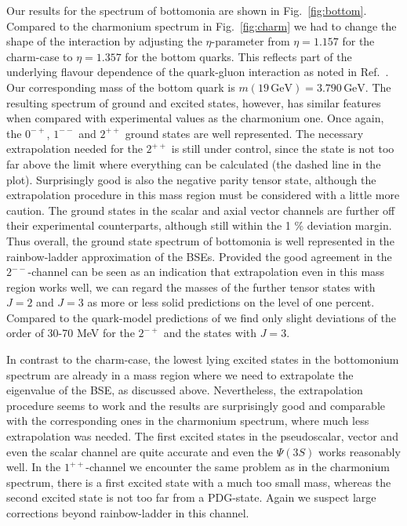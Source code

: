 Our results for the spectrum of bottomonia are shown in Fig.~\ref{fig:bottom}. Compared to
the charmonium spectrum in Fig.~\ref{fig:charm} we had to change the shape of the interaction
by adjusting the $\eta$-parameter from $\eta=1.157$ for the charm-case to $\eta=1.357$ 
for the bottom quarks. This reflects part of the underlying flavour dependence of the quark-gluon 
interaction as noted in Ref.~\cite{Williams:2014iea}. Our corresponding mass of the bottom quark
is $m(19 \,\mbox{GeV})=3.790 \,\mbox{GeV}$. The resulting spectrum of ground and excited states, 
however, has similar features when compared with experimental values as the charmonium one. 
Once again, the $0^{-+}$, $1^{--}$ and $2^{++}$ ground states are well represented. The necessary
extrapolation needed for the $2^{++}$ is still under control, since the state is not too far above
the limit where everything can be calculated (the dashed line in the plot). Surprisingly good is
also the negative parity tensor state, although the extrapolation procedure in this
mass region must be considered with a little more caution. The ground states
in the scalar and axial vector channels are further off their experimental counterparts,
although still within the 1 \% deviation margin. Thus overall, the ground state spectrum
of bottomonia is well represented in the rainbow-ladder approximation of the BSEs.
Provided the good agreement in the $2^{--}$-channel can be seen as an indication that 
extrapolation even in this mass region works well, we can regard the masses of the 
further tensor states with $J=2$ and $J=3$ as more or less solid predictions 
on the level of one percent. Compared to the quark-model predictions of \cite{Ebert:2011jc}
we find only slight deviations of the order of 30-70 MeV for the $2^{-+}$ and the states 
with $J=3$.

In contrast to the charm-case, the lowest lying excited states in the bottomonium spectrum are
already in a mass region where we need to extrapolate the eigenvalue of the BSE, as discussed
above. Nevertheless, the extrapolation procedure seems to work and the results are surprisingly
good and comparable with the corresponding ones in the charmonium spectrum, where much less
extrapolation was needed. The first excited states in the pseudoscalar, vector and even the
scalar channel are quite accurate and even the $\Psi(3S)$ works reasonably well. In the $1^{++}$-channel
we encounter the same problem as in the charmonium spectrum, there is a first excited state 
with a much too small mass, whereas the second excited state is not too far from a PDG-state.
Again we suspect large corrections beyond rainbow-ladder in this channel.

